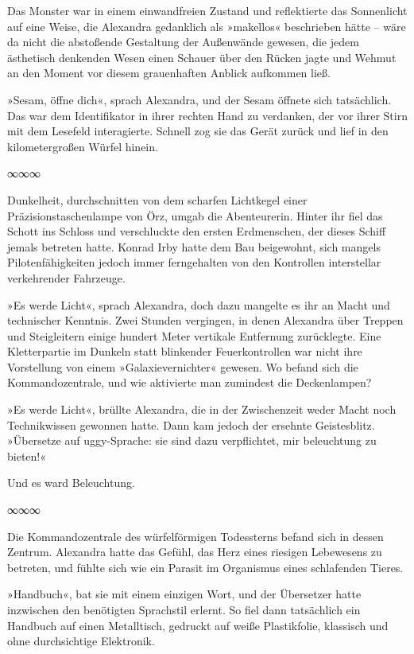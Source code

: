 Das Monster war in einem einwandfreien Zustand und reflektierte das Sonnenlicht auf eine Weise, die Alexandra gedanklich als »makellos« beschrieben hätte – wäre da nicht die abstoßende Gestaltung der Außenwände gewesen, die jedem ästhetisch denkenden Wesen einen Schauer über den Rücken jagte und Wehmut an den Moment vor diesem grauenhaften Anblick aufkommen ließ.

»Sesam, öffne dich«, sprach Alexandra, und der Sesam öffnete sich tatsächlich. Das war dem Identifikator in ihrer rechten Hand zu verdanken, der vor ihrer Stirn mit dem Lesefeld interagierte. Schnell zog sie das Gerät zurück und lief in den kilometergroßen Würfel hinein.

\begin{center}
∞∞∞
\end{center}

Dunkelheit, durchschnitten von dem scharfen Lichtkegel einer Präzisionstaschenlampe von Örz, umgab die Abenteurerin. Hinter ihr fiel das Schott ins Schloss und verschluckte den ersten Erdmenschen, der dieses Schiff jemals betreten hatte. Konrad Irby hatte dem Bau beigewohnt, sich mangels Pilotenfähigkeiten jedoch immer ferngehalten von den Kontrollen interstellar verkehrender Fahrzeuge.

»Es werde Licht«, sprach Alexandra, doch dazu mangelte es ihr an Macht und technischer Kenntnis. Zwei Stunden vergingen, in denen Alexandra über Treppen und Steigleitern einige hundert Meter vertikale Entfernung zurücklegte. Eine Kletterpartie im Dunkeln statt blinkender Feuerkontrollen war nicht ihre Vorstellung von einem »Galaxievernichter« gewesen. Wo befand sich die Kommandozentrale, und wie aktivierte man zumindest die Deckenlampen?

»Es werde Licht«, brüllte Alexandra, die in der Zwischenzeit weder Macht noch Technikwissen gewonnen hatte. Dann kam jedoch der ersehnte Geistesblitz. »Übersetze auf uggy-Sprache: sie sind dazu verpflichtet, mir beleuchtung zu bieten!«

Und es ward Beleuchtung.

\begin{center}
∞∞∞
\end{center}

Die Kommandozentrale des würfelförmigen Todessterns befand sich in dessen Zentrum. Alexandra hatte das Gefühl, das Herz eines riesigen Lebewesens zu betreten, und fühlte sich wie ein Parasit im Organismus eines schlafenden Tieres.

»Handbuch«, bat sie mit einem einzigen Wort, und der Übersetzer hatte inzwischen den benötigten Sprachstil erlernt. So fiel dann tatsächlich ein Handbuch auf einen Metalltisch, gedruckt auf weiße Plastikfolie, klassisch und ohne durchsichtige Elektronik.

